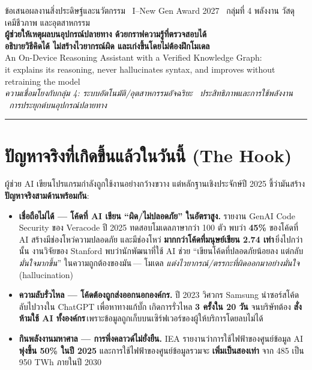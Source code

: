 \documentclass[fontsize=16pt,a4paper]{scrartcl}
\begin{document}
\begin{center}
{\small\color{nb}ข้อเสนอผลงานสิ่งประดิษฐ์และนวัตกรรม \textperiodcentered\ I--New Gen Award 2027 \textperiodcentered\ กลุ่มที่ 4 พลังงาน วัสดุ เคมีชีวภาพ และอุตสาหกรรม}\\[6pt]
{\LARGE\bfseries\color{nb} ผู้ช่วยให้เหตุผลบนอุปกรณ์ปลายทาง ด้วยกราฟความรู้ที่ตรวจสอบได้}\\[3pt]
{\Large\bfseries\color{nb} อธิบายวิธีคิดได้ ไม่สร้างไวยากรณ์ผิด และเก่งขึ้นโดยไม่ต้องฝึกโมเดล}\\[5pt]
{\small An On-Device Reasoning Assistant with a Verified Knowledge Graph:\\ it explains its reasoning, never hallucinates syntax, and improves without retraining the model}\\[4pt]
{\small\itshape ความเชื่อมโยงกับกลุ่ม 4: ระบบอัตโนมัติ/อุตสาหกรรมอัจฉริยะ \textperiodcentered\ ประสิทธิภาพและการใช้พลังงาน \textperiodcentered\ การประยุกต์บนอุปกรณ์ปลายทาง}
\end{center}
\hrule\vspace{6pt}

\section{ปัญหาจริงที่เกิดขึ้นแล้วในวันนี้ (The Hook)}
ผู้ช่วย AI เขียนโปรแกรมกำลังถูกใช้งานอย่างกว้างขวาง แต่หลักฐานเชิงประจักษ์ปี 2025 ชี้ว่ามันสร้าง \textbf{ปัญหาจริงสามด้านพร้อมกัน}:

\begin{itemize}
\item \textbf{เชื่อถือไม่ได้ --- โค้ดที่ AI เขียน ``ผิด/ไม่ปลอดภัย'' ในอัตราสูง.} รายงาน GenAI Code Security ของ Veracode ปี 2025 ทดสอบโมเดลภาษากว่า 100 ตัว พบว่า \textbf{45\%} ของโค้ดที่ AI สร้างมีช่องโหว่ความปลอดภัย และมีช่องโหว่ \textbf{มากกว่าโค้ดที่มนุษย์เขียน 2.74 เท่า}\,\footnotemark[1] ยิ่งไปกว่านั้น งานวิจัยของ Stanford พบว่านักพัฒนาที่ใช้ AI ช่วย ``เขียนโค้ดที่ปลอดภัยน้อยลง แต่กลับ \emph{มั่นใจมากขึ้น}'' ในความถูกต้องของมัน\,\footnotemark[2] --- โมเดล \emph{แต่งไวยากรณ์/ตรรกะที่ผิดออกมาอย่างมั่นใจ} (hallucination)
\item \textbf{ความลับรั่วไหล --- โค้ดต้องถูกส่งออกนอกองค์กร.} ปี 2023 วิศวกร Samsung นำซอร์สโค้ดลับไปวางใน ChatGPT เพื่อหาทางแก้บั๊ก เกิดการรั่วไหล \textbf{3 ครั้งใน 20 วัน} จนบริษัทต้อง \textbf{สั่งห้ามใช้ AI ทั้งองค์กร}\,\footnotemark[3] เพราะข้อมูลถูกเก็บบนเซิร์ฟเวอร์ของผู้ให้บริการโดยลบไม่ได้
\item \textbf{กินพลังงานมหาศาล --- การพึ่งคลาวด์ไม่ยั่งยืน.} IEA รายงานว่าการใช้ไฟฟ้าของศูนย์ข้อมูล AI \textbf{พุ่งขึ้น 50\% ในปี 2025} และการใช้ไฟฟ้าของศูนย์ข้อมูลรวมจะ \textbf{เพิ่มเป็นสองเท่า} จาก 485 เป็น 950 TWh ภายในปี 2030\,\footnotemark[4]
\end{itemize}
\end{document}
